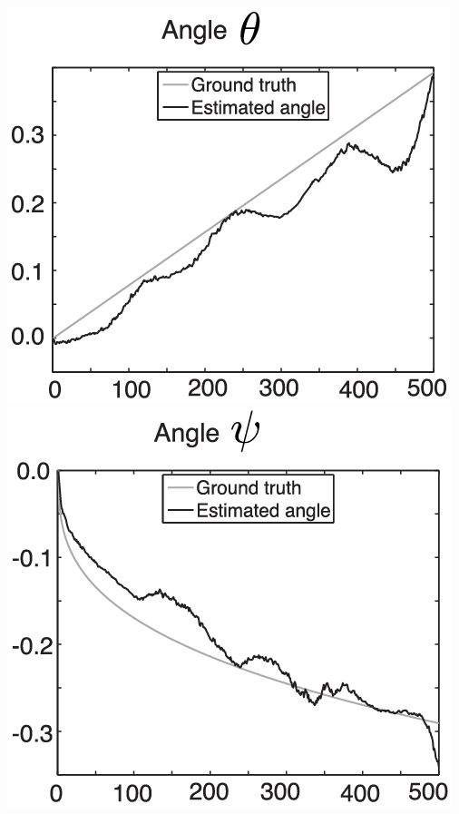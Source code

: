 \documentclass{beamer}
\begin{document}
\begin{frame}
\begin{columns}
\begin{column}{.25\textwidth}
\includegraphics[width=\linewidth]{../Bilder/Fig8b}\\
\includegraphics[width=\linewidth]{../Bilder/Fig8c}\\
\end{column}
\end{columns}
\end{frame}
\end{document}
